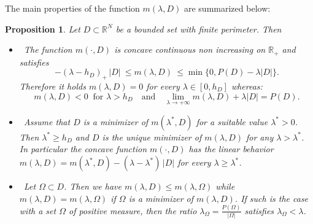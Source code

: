 \documentclass[reqno,11pt]{amsart}
\newtheorem{proposition}[theorem]{Proposition}
\theoremstyle{definition}
\numberwithin{equation}{section}
\def\R{\mathbb{R}}
\newcommand{\1}{{{\bf 1}\kern-0,28em\rm l}}
\newcommand{\med}{\medskip\noindent}
\def\O{\Omega}
\def\l{\lambda}
\begin{document}
  The main  properties of the function $m(\l,D)$ are  summarized below:


\begin{proposition} \label{monotony}  Let $D\subset \R^N$ be a bounded set with finite perimeter. Then
 \begin{itemize} 
\item [(i)]\ The function $m(\cdot,D)$ is concave  continuous non increasing on $\R_+$ and satisfies
\begin{equation}\label{ineqmlD}
- (\l- h_D)_+ \, |D|  \ \le m(\l,D) \ \le \min\{0,P(D)-\l |D|\} .
\end{equation}
   Therefore  it holds   $m(\l,D) =0$ for every  $\l\in [0, h_D]$ whereas:
\begin{equation}\label{mlD=0} 
  m(\l,D) <0 \  \text{ for $\l >h_D$} \quad \text{and} \quad \lim_{\l\to +\infty} m(\l,D) + \l |D|=P(D) .
\end{equation}

\item [(ii)]\ Assume that $D$ is a minimizer of $m(\l^*,D)$ for a suitable value $\l^*>0$. Then $\l^*\ge h_D$ and $D$ is the unique minimizer of $m(\l,D)$ for any $\l>\l^*$.
In particular the concave function $m(\cdot,D)$ has the linear behavior $m(\l,D)= m(\l^*,D) - (\l-\l^*)\, |D|$ for every  $\l\ge \l^*$.


\med
\item [(iii)]\  Let $\O\subset D$. Then we have $ m(\l,D)\le m(\l,\O)$ while 
$ m(\l,D)= m(\l,\O)$ if $\O$ is a minimizer of $m(\l,D)$. 
If such is the case with a set $\O$ of positive measure, then the ratio  $\l_\O= \frac{P(\O)}{|\O|}$ satisfies  $\lambda_\Omega < \lambda$.

\end{itemize}
\end{proposition}
\end{document}
